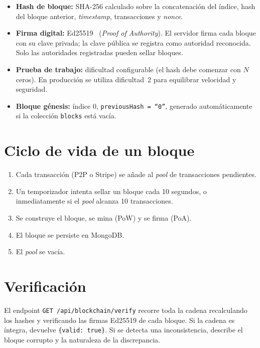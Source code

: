 \begin{itemize}
  \item \textbf{Hash de bloque:} SHA-256 calculado sobre la concatenación del índice, hash del bloque anterior, \emph{timestamp}, transacciones y \emph{nonce}.
  \item \textbf{Firma digital:} Ed25519~\cite{ed25519} (\emph{Proof of Authority}). El servidor firma cada bloque con su clave privada; la clave pública se registra como autoridad reconocida. Solo las autoridades registradas pueden sellar bloques.
  \item \textbf{Prueba de trabajo:} dificultad configurable (el hash debe comenzar con $N$ ceros). En producción se utiliza dificultad~2 para equilibrar velocidad y seguridad.
  \item \textbf{Bloque génesis:} índice 0, \texttt{previousHash = ``0''}, generado automáticamente si la colección \texttt{blocks} está vacía.
\end{itemize}

\section{Ciclo de vida de un bloque}

\begin{enumerate}
  \item Cada transacción (P2P o Stripe) se añade al \emph{pool} de transacciones pendientes.
  \item Un temporizador intenta sellar un bloque cada 10 segundos, o inmediatamente si el \emph{pool} alcanza 10 transacciones.
  \item Se construye el bloque, se mina (PoW) y se firma (PoA).
  \item El bloque se persiste en MongoDB.
  \item El \emph{pool} se vacía.
\end{enumerate}

\section{Verificación}

El endpoint \texttt{GET /api/blockchain/verify} recorre toda la cadena recalculando los hashes y verificando las firmas Ed25519 de cada bloque. Si la cadena es íntegra, devuelve \texttt{\{valid: true\}}. Si se detecta una inconsistencia, describe el bloque corrupto y la naturaleza de la discrepancia.

